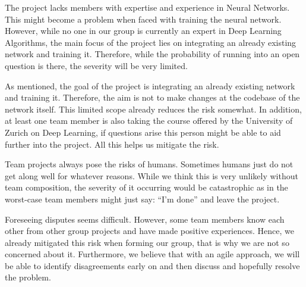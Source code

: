 \documentclass[11pt]{article}
\begin{document}
\begin{tcolorbox}[title=\textbf{Lack of knowledge in Deep Learning Networks}, sharp corners, colframe=MaterialYellow600, colback=MaterialYellow100, coltitle=white]
\begin{description}[noitemsep]
\item[Risk:] The project lacks members with expertise and experience in Neural Networks. This might become a problem when faced with training the neural network. However, while no one in our group is currently an expert in Deep Learning Algorithms, the main focus of the project lies on integrating an already existing network and training it. Therefore, while the probability of running into an open question is there, the severity will be very limited.
\item[Probability:] <2>
\item[Severity:] <1>
\item[Risk exposure:] <2>
\item[Mitigation:] As mentioned, the goal of the project is integrating an already existing network and training it. Therefore, the aim is not to make changes at the codebase of the network itself. This limited scope already reduces the risk somewhat. In addition, at least one team member is also taking the course offered by the University of Zurich on Deep Learning, if questions arise this person might be able to aid further into the project. All this helps us mitigate the risk.
\end{description}
\end{tcolorbox}

\begin{tcolorbox}[title=\textbf{Bad atmosphere among team members}, sharp corners, colframe=MaterialYellow600, colback=MaterialYellow100, coltitle=white]
\begin{description}[noitemsep]
\item[Risk:] Team projects always pose the risks of humans. Sometimes humans just do not get along well for whatever reasons. While we think this is very unlikely without team composition, the severity of it occurring would be catastrophic as in the worst-case team members might just say: “I'm done” and leave the project.
\item[Probability:] <1>
\item[Severity:] <4>
\item[Risk exposure:] <4>
\item[Mitigation:] Foreseeing disputes seems difficult. However, some team members know each other from other group projects and have made positive experiences. Hence, we already mitigated this risk when forming our group, that is why we are not so concerned about it. Furthermore, we believe that with an agile approach, we will be able to identify disagreements early on and then discuss and hopefully resolve the problem.
\end{description}
\end{tcolorbox}
\end{document}
